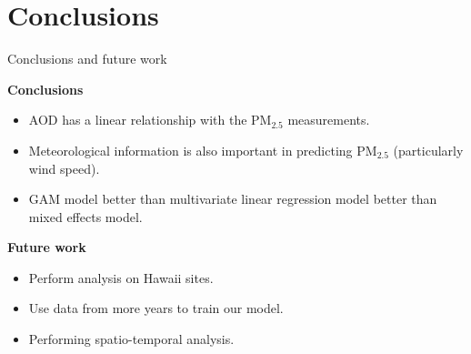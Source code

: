 \section{Conclusions}
\begin{frame}{Conclusions and future work}

\textbf{Conclusions}

\begin{itemize}

\item AOD has a linear relationship with the PM$_{2.5}$ measurements.
\item Meteorological information is also important in predicting PM$_{2.5}$ (particularly wind speed).
\item GAM model better than multivariate linear regression model better than mixed effects model.
\end{itemize}

\vspace{5mm}
\textbf{Future work}
\begin{itemize}

\item Perform analysis on Hawaii sites. 
\item Use data from more years to train our model.
\item Performing spatio-temporal analysis. 
\end{itemize}

\end{frame}


